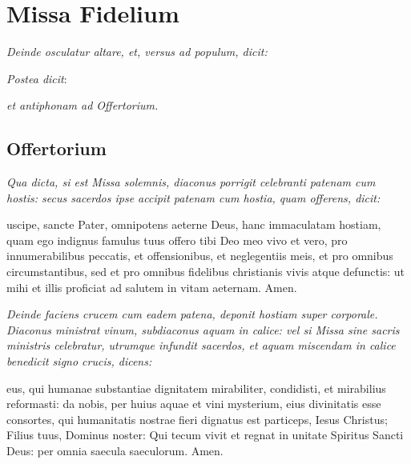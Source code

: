 {\let\cleardoublepage\clearpage\chapter{Missa Fidelium}}


\textit{Deinde osculatur altare, et, versus ad populum, dicit:}


\textit{Postea dicit}:


\textit{et antiphonam ad Offertorium.}

\vspace{\baselineskip}

\section{Offertorium}



\textit{%
    Qua dicta, si est Missa solemnis, diaconus porrigit celebranti patenam cum
    hostis: secus sacerdos ipse accipit patenam cum hostia, quam offerens,
    dicit:
}

uscipe, sancte Pater, omnipotens aeterne Deus, hanc immaculatam
hostiam, quam ego indignus famulus tuus offero tibi Deo meo vivo et vero, pro
innumerabilibus peccatis, et offensionibus, et neglegentiis meis, et pro omnibus
circumstantibus, sed et pro omnibus fidelibus christianis vivis atque defunctis:
ut mihi et illis proficiat ad salutem in vitam aeternam.  Amen.

\textit{%
    Deinde faciens crucem cum eadem patena, deponit hostiam super corporale.
    Diaconus ministrat vinum, subdiaconus aquam in calice: vel si Missa sine
    sacris ministris celebratur, utrumque infundit sacerdos, et aquam miscendam
    in calice benedicit signo crucis, dicens:
}

eus, qui humanae substantiae dignitatem mirabiliter, condidisti, et
mirabilius reformasti: da nobis, per huius aquae et vini mysterium, eius
divinitatis esse consortes, qui humanitatis nostrae fieri dignatus est
particeps, Iesus Christus; Filius tuus, Dominus noster: Qui tecum vivit et
regnat in unitate Spiritus Sancti Deus: per omnia saecula saeculorum.  Amen.

